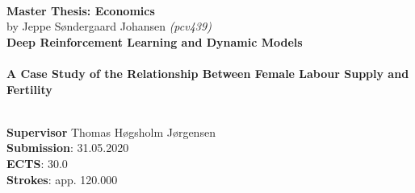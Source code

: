 \documentclass[12pt,oneside]{article}
\begin{document}

    \thispagestyle{empty}
    \vspace*{3.75cm}
    \textbf{\large\\ Master Thesis: Economics}\\
    \vspace*{0.1cm}
    by Jeppe Søndergaard Johansen \textit{(pcv439)} \hspace{1.0cm}
    \vspace*{2.75cm}\\
    \textbf{\LARGE Deep Reinforcement Learning and Dynamic Models} \\
    \vspace*{0.1cm} \\
    \textbf{A Case Study of the Relationship Between Female Labour Supply and Fertility }
    \begin{tabbing}
    \\[7.55cm]
    \textbf{Supervisor} Thomas Høgsholm Jørgensen \\
    \textbf{Submission}: 31.05.2020\\
    \textbf{ECTS}: 30.0\\
    \textbf{Strokes}: app. 120.000\\
    \end{tabbing}
    \newpage
    \ClearWallPaper
\end{document}
